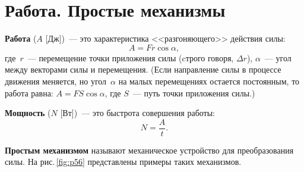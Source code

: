 \documentclass[main.tex]{subfiles}
\begin{document}

 

 

 
   

\section{Работа. Простые механизмы}

\textbf{Работа} ($A$ [Дж])~--- это характеристика <<разгоняющего>> действия силы:
\begin{equation}
    A=Fr\cos\alpha,
\end{equation}
где~$r$~--- перемещение точки приложения силы (cтрого говоря, $\Delta r$), $\alpha$~--- угол между векторами силы и перемещения. (Если направление силы в процессе движения меняется, но угол~$\alpha$ на малых перемещениях остается постоянным, то работа равна: $A=FS\cos\alpha$, где $S$~--- путь точки приложения силы.)

\textbf{Мощность} ($N$ [Вт])~--- это быстрота совершения работы:
\begin{equation}
    N=\frac{A}{t}.
\end{equation}
%

\textbf{Простым механизмом} называют механическое устройство для преобразования силы. На рис.\,\ref{fig:p56} представлены примеры таких механизмов.
\end{document}
